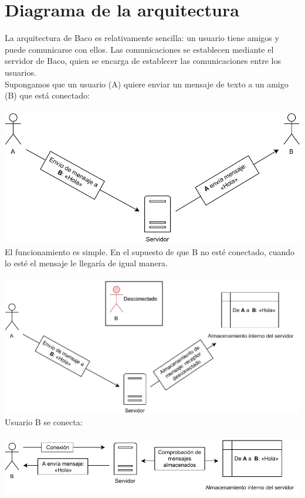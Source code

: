 \documentclass[12pt, a4paper]{book} %
\begin{document}
		\section{Diagrama de la arquitectura}
		La arquitectura de Baco es relativamente sencilla: un usuario tiene amigos y puede comunicarse con ellos. Las comunicaciones se establecen mediante el servidor de Baco, quien se encarga de establecer las comunicaciones entre los usuarios.\\
		Supongamos que un usuario (A) quiere enviar un mensaje de texto a un amigo (B) que está conectado:\\\\
		\includegraphics[width=\textwidth,height=\textheight, keepaspectratio]{img/BasicTextCommDiagram.pdf}
		El funcionamiento es simple. En el supuesto de que B no esté conectado, cuando lo esté el mensaje le llegaría de igual manera.\\\\
		\includegraphics[width=\textwidth,height=\textheight, keepaspectratio]{img/BasicTextCommNotConnDiagram.pdf}\\
		Usuario B se conecta:\\\\
		\includegraphics[width=\textwidth,height=\textheight, keepaspectratio]{img/BasicTextCommStoredDiagram.pdf}\\
\end{document}
